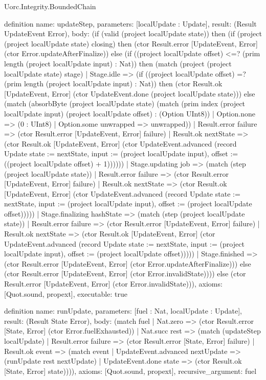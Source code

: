 \begin{lexlean}{Uorc.Integrity.BoundedChain}
\begin{semanticmodule}
definition{
  name: updateStep,
  parameters: [localUpdate : Update],
  result: (Result UpdateEvent Error),
  body: (if (valid (project localUpdate state)) then (if (project (project localUpdate state) closing) then (ctor Result.error [UpdateEvent, Error] (ctor Error.updateAfterFinalize)) else (if ((project localUpdate offset) <=? (prim length (project localUpdate input) : Nat)) then (match (project (project localUpdate state) stage)
    | Stage.idle => (if ((project localUpdate offset) =? (prim length (project localUpdate input) : Nat)) then (ctor Result.ok [UpdateEvent, Error] (ctor UpdateEvent.done (project localUpdate state))) else (match (absorbByte (project localUpdate state) (match (prim index (project localUpdate input) (project localUpdate offset) : (Option UInt8))
        | Option.none => (0 : UInt8)
        | Option.some unwrapped => unwrapped))
      | Result.error failure => (ctor Result.error [UpdateEvent, Error] failure)
      | Result.ok nextState => (ctor Result.ok [UpdateEvent, Error] (ctor UpdateEvent.advanced (record Update {state := nextState, input := (project localUpdate input), offset := ((project localUpdate offset) + 1)})))))
    | Stage.updating job => (match (step (project localUpdate state))
      | Result.error failure => (ctor Result.error [UpdateEvent, Error] failure)
      | Result.ok nextState => (ctor Result.ok [UpdateEvent, Error] (ctor UpdateEvent.advanced (record Update {state := nextState, input := (project localUpdate input), offset := (project localUpdate offset)}))))
    | Stage.finalizing hashState => (match (step (project localUpdate state))
      | Result.error failure => (ctor Result.error [UpdateEvent, Error] failure)
      | Result.ok nextState => (ctor Result.ok [UpdateEvent, Error] (ctor UpdateEvent.advanced (record Update {state := nextState, input := (project localUpdate input), offset := (project localUpdate offset)}))))
    | Stage.finished => (ctor Result.error [UpdateEvent, Error] (ctor Error.updateAfterFinalize))) else (ctor Result.error [UpdateEvent, Error] (ctor Error.invalidState)))) else (ctor Result.error [UpdateEvent, Error] (ctor Error.invalidState))),
  axioms: [Quot.sound, propext],
  executable: true
}

definition{
  name: runUpdate,
  parameters: [fuel : Nat, localUpdate : Update],
  result: (Result State Error),
  body: (match fuel
    | Nat.zero => (ctor Result.error [State, Error] (ctor Error.fuelExhausted))
    | Nat.succ rest => (match (updateStep localUpdate)
      | Result.error failure => (ctor Result.error [State, Error] failure)
      | Result.ok event => (match event
        | UpdateEvent.advanced nextUpdate => (runUpdate rest nextUpdate)
        | UpdateEvent.done state => (ctor Result.ok [State, Error] state)))),
  axioms: [Quot.sound, propext],
  recursive_argument: fuel
}


\end{semanticmodule}
\end{lexlean}
